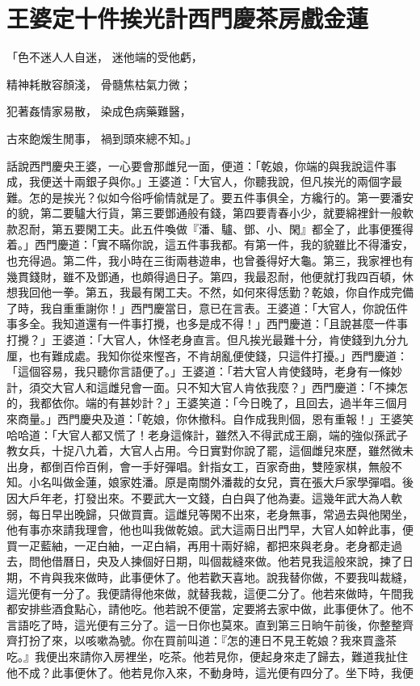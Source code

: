 %

\chapter{王婆定十件挨光計\KG 西門慶茶房戲金蓮}

「色不迷人人自迷，  迷他端的受他虧，

精神耗散容顏淺，  骨髓焦枯氣力微；

犯著姦情家易散，  染成色病藥難醫，

古來飽煖生閒事，  禍到頭來總不知。」

話說西門慶央王婆，一心要會那雌兒一面，便道：「乾娘，你端的與我說這件事成，我便送十兩銀子與你。」王婆道：「大官人，你聽我說，但凡挨光的兩個字最難。怎的是挨光？似如今俗呼偷情就是了。要五件事俱全，方纔行的。第一要潘安的貌，第二要驢大行貨，第三要鄧通般有錢，第四要青春小少，就要綿裡針一般軟款忍耐，第五要閑工夫。此五件喚做『潘、驢、鄧、小、閑』都全了，此事便獲得着。」西門慶道：「實不瞞你說，這五件事我都。有第一件，我的貌雖比不得潘安，也充得過。第二件，我小時在三街兩巷遊串，也曾養得好大龜。第三，我家裡也有幾貫錢財，雖不及鄧通，也頗得過日子。第四，我最忍耐，他便就打我四百頓，休想我回他一拳。第五，我最有閑工夫。不然，如何來得恁勤？乾娘，你自作成完備了時，我自重重謝你！」西門慶當日，意已在言表。王婆道：「大官人，你說伍件事多全。我知道還有一件事打攪，也多是成不得！」西門慶道：「且說甚麼一件事打攪？」王婆道：「大官人，休怪老身直言。但凡挨光最難十分，肯使錢到九分九厘，也有難成處。我知你從來慳吝，不肯胡亂便使錢，只這件打擾。」西門慶道：「這個容易，我只聽你言語便了。」王婆道：「若大官人肯使錢時，老身有一條妙計，須交大官人和這雌兒會一面。只不知大官人肯依我麼？」西門慶道：「不揀怎的，我都依你。端的有甚妙計？」王婆笑道：「今日晚了，且回去，過半年三個月來商量。」西門慶央及道：「乾娘，你休撤科。自作成我則個，恩有重報！」王婆笑哈哈道：「大官人都又慌了！老身這條計，雖然入不得武成王廟，端的強似孫武子教女兵，十捉八九着，大官人占用。今日實對你說了罷，這個雌兒來歷，雖然微未出身，都倒百伶百俐，會一手好彈唱。針指女工，百家奇曲，雙陸家棋，無般不知。小名叫做金蓮，娘家姓潘。原是南關外潘裁的女兒，賣在張大戶家學彈唱。後因大戶年老，打發出來。不要武大一文錢，白白與了他為妻。這幾年武大為人軟弱，每日早出晚歸，只做買賣。這雌兒等閑不出來，老身無事，常過去與他閑坐，他有事亦來請我理會，他也叫我做乾娘。武大這兩日出門早，大官人如幹此事，便買一疋藍紬，一疋白紬，一疋白絹，再用十兩好綿，都把來與老身。老身都走過去，問他借曆日，央及人揀個好日期，叫個裁縫來做。他若見我這般來說，揀了日期，不肯與我來做時，此事便休了。他若歡天喜地。說我替你做，不要我叫裁縫，這光便有一分了。我便請得他來做，就替我裁，這便二分了。他若來做時，午間我都安排些酒食點心，請他吃。他若說不便當，定要將去家中做，此事便休了。他不言語吃了時，這光便有三分了。這一日你也莫來。直到第三日晌午前後，你整整齊齊打扮了來，以咳嗽為號。你在買前叫道：『怎的連日不見王乾娘？我來買盞茶吃。』我便出來請你入房裡坐，吃茶。他若見你，便起身來走了歸去，難道我扯住他不成？此事便休了。他若見你入來，不動身時，這光便有四分了。坐下時，我便